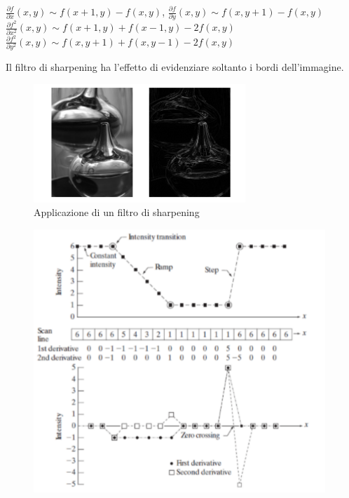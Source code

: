 \begin{center}
    $\frac{\partial{f}}{\partial{x}}(x,y) \sim f(x+1, y) - f(x, y)$,
    $\frac{\partial{f}}{\partial{y}}(x,y) \sim f(x,y+1) - f(x,y)$ \\
    $\frac{\partial{f^2}}{\partial{x^2}}(x,y) \sim f(x+1,y) + f(x-1, y) -
        2f(x,y)$ \\
    $\frac{\partial{f^2}}{\partial{y^2}}(x,y) \sim f(x,y+1) + f(x, y-1) -
        2f(x,y)$
\end{center}

Il filtro di sharpening ha l'effetto di evidenziare soltanto i bordi
dell'immagine.
\begin{figure}[H]
    \centering
    \includegraphics[width=8cm, keepaspectratio]{capitoli/immagini/imgs/sharpening.png}
    \caption{Applicazione di un filtro di sharpening}
\end{figure}

\begin{figure}[H]
    \centering
    \includegraphics[width=11cm, keepaspectratio]{capitoli/immagini/imgs/sharpering2.png}
\end{figure}

